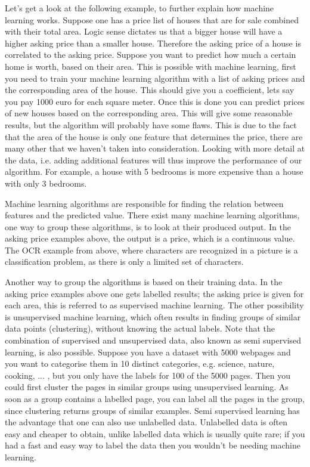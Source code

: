 Let's get a look at the following example, to further explain how machine learning works. Suppose one has a price list of houses that are for sale combined with their total area. Logic sense dictates us that a bigger house will have a higher asking price than a smaller house. Therefore the asking price of a house is correlated to the asking price. Suppose you want to predict how much a certain home is worth, based on their area. This is possible with machine learning, first you need to train your machine learning algorithm with a list of asking prices and the corresponding area of the house. This should give you a coefficient, lets say you pay 1000 euro for each square meter. Once this is done you can predict prices of new houses based on the corresponding area. 
\npar
This will give some reasonable results, but the algorithm will probably have some flaws. This is due to the fact that the area of the house is only one feature that determines the price, there are many other that we haven't taken into consideration. Looking with more detail at the data, i.e. adding additional features will thus improve the performance of our algorithm. For example, a house with 5 bedrooms is more expensive than a house with only 3 bedrooms.

\npar

Machine learning algorithms are responsible for finding the relation between features and the predicted value. There exist many machine learning algorithms, one way to group these algorithms, is to look at their produced output. In the asking price examples above, the output is a price, which is a continuous value. The OCR example from above, where characters are recognized in a picture is a classification problem, as there is only a limited set of characters. 

\npar

Another way to group the algorithms is based on their training data. In the asking price examples above one gets labelled results; the asking price is given for each area, this is referred to as supervised machine learning. The other possibility is unsupervised machine learning, which often results in finding groups of similar data points (clustering), without knowing the actual labels. Note that the combination of supervised and unsupervised data, also known as semi supervised learning, is also possible. Suppose you have a dataset with 5000 webpages and you want to categorise them in 10 distinct categories, e.g. science, nature, cooking, ... , but you only have the labels for 100 of the 5000 pages. Then you could first cluster the pages in similar groups using unsupervised learning. As soon as a group contains a labelled page, you can label all the pages in the group, since clustering returns groups of similar examples. Semi supervised learning has the advantage that one can also use unlabelled data. Unlabelled data is often easy and cheaper to obtain, unlike labelled data which is usually quite rare; if you had a fast and easy way to label the data then you wouldn't be needing machine learning.

